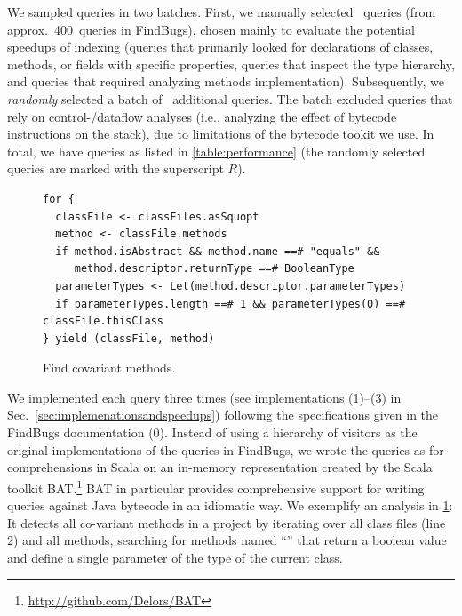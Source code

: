 We sampled queries in two batches. First, we manually selected \manualQueryCount~queries (from approx.\ 400~queries in FindBugs), chosen mainly to evaluate the potential speedups of indexing (queries that primarily looked for declarations of classes, methods, or fields with specific properties, queries that inspect the type hierarchy, and queries that required analyzing methods implementation).
Subsequently, we \emph{randomly} selected a batch of \randomQueryCount~additional queries. 
The batch excluded queries that rely on control-/dataflow analyses (i.e., analyzing the effect of bytecode instructions on the stack), due to limitations of the bytecode tookit we use.
In total, we have \queryCount{} queries as listed in \cref{table:performance} (the randomly selected queries are marked with the superscript $R$).




\begin{figure}
\centering
\begin{lstlisting}
for {
  classFile <- classFiles.asSquopt
  method <- classFile.methods
  if method.isAbstract && method.name ==# "equals" &&
     method.descriptor.returnType ==# BooleanType
  parameterTypes <- Let(method.descriptor.parameterTypes)
  if parameterTypes.length ==# 1 && parameterTypes(0) ==# classFile.thisClass
} yield (classFile, method)
\end{lstlisting}
\caption{Find covariant  methods.}
\label{fig:covariant-equals}
\end{figure}



We implemented each query three times (see implementations (1)--(3) in Sec.~\ref{sec:implemenationsandspeedups}) following the specifications given in the FindBugs documentation (0). Instead of using a hierarchy of visitors as the original implementations of the queries in FindBugs, we wrote the queries as for-comprehensions in Scala on an in-memory representation created by the Scala toolkit BAT\@.\footnote{\url{http://github.com/Delors/BAT}}
BAT in particular provides comprehensive support for 
writing queries against Java bytecode in an idiomatic way.
We exemplify an analysis in \cref{fig:covariant-equals}: It detects all co-variant  methods in a project by iterating over all class files (line 2) and all methods, searching for methods named ``'' that return a boolean value and define a single parameter of the type of the current class. 


